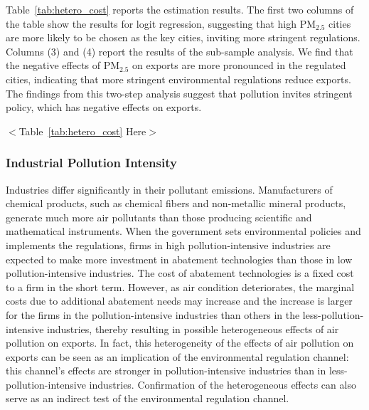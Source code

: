 \documentclass[12pt]{article}
\begin{document}
Table~\ref{tab:hetero_cost} reports the estimation results. The first two columns of the table show the results for logit regression, suggesting that high $\mathrm{PM_{2.5}}$ cities are more likely to be chosen as the key cities, inviting more stringent regulations.  Columns (3) and (4) report the results of the sub-sample analysis. 
We find that the negative effects of $\mathrm{PM_{2.5}}$ on exports are more pronounced
in the regulated cities, indicating that more stringent environmental regulations reduce exports. The findings from this two-step analysis suggest that pollution invites stringent policy, which has negative effects on exports. 

\begin{center}
$<$Table~\ref{tab:hetero_cost} Here$>$
\end{center}

  \subsubsection{Industrial Pollution Intensity}
  \label{sec:5.2.1} 
  Industries differ significantly in their pollutant
  emissions. Manufacturers of chemical products, such as chemical fibers and
  non-metallic mineral products, generate much more air pollutants than those
  producing scientific and mathematical instruments. When the government sets
  environmental policies and implements the regulations, firms in high
  pollution-intensive industries are expected to make more investment in
  abatement technologies than those in low pollution-intensive industries. The
  cost of abatement technologies is a fixed cost to a firm in the short term.
  However, as air condition deteriorates, the marginal costs due to additional
  abatement needs may increase and the increase is larger for the firms in the
  pollution-intensive industries than others in the less-pollution-intensive
  industries, thereby resulting in possible heterogeneous effects of air
  pollution on exports. In fact, this heterogeneity of the effects of air
pollution on exports can be seen as an implication of the environmental
regulation channel: this channel's effects are stronger in
pollution-intensive industries than in less-pollution-intensive industries.
Confirmation of the heterogeneous effects can also serve as an indirect test
of the environmental regulation channel.
  
\end{document}
